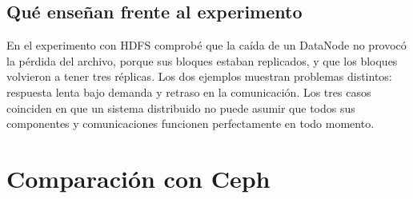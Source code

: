\documentclass[11pt,a4paper]{article}
\begin{document}
\subsection{Qué enseñan frente al experimento}
En el experimento con HDFS comprobé que la caída de un DataNode no provocó la pérdida del archivo, porque sus bloques estaban replicados, y que los bloques volvieron a tener tres réplicas. Los dos ejemplos muestran problemas distintos: respuesta lenta bajo demanda y retraso en la comunicación. Los tres casos coinciden en que un sistema distribuido no puede asumir que todos sus componentes y comunicaciones funcionen perfectamente en todo momento.

\section{Comparación con Ceph}\label{sec:comp}
\end{document}
